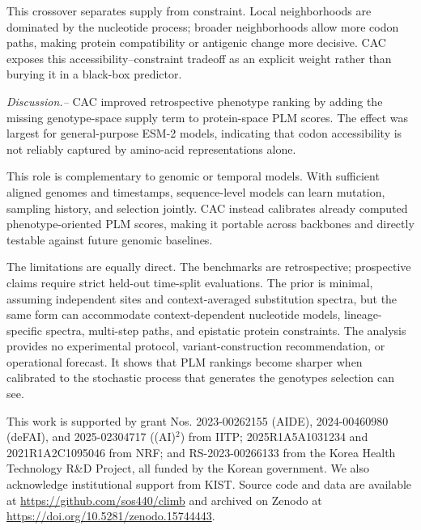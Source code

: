 \documentclass[aps,prl,reprint,superscriptaddress,nofootinbib,floatfix]{revtex4-2}
\begin{document}
This crossover separates supply from constraint. Local neighborhoods are dominated by the nucleotide process; broader neighborhoods allow more codon paths, making protein compatibility or antigenic change more decisive. CAC exposes this accessibility--constraint tradeoff as an explicit weight rather than burying it in a black-box predictor.

\emph{Discussion.--}
CAC improved retrospective phenotype ranking by adding the missing genotype-space supply term to protein-space PLM scores. The effect was largest for general-purpose ESM-2 models, indicating that codon accessibility is not reliably captured by amino-acid representations alone.

This role is complementary to genomic or temporal models. With sufficient aligned genomes and timestamps, sequence-level models can learn mutation, sampling history, and selection jointly. CAC instead calibrates already computed phenotype-oriented PLM scores, making it portable across backbones and directly testable against future genomic baselines.

The limitations are equally direct. The benchmarks are retrospective; prospective claims require strict held-out time-split evaluations. The prior is minimal, assuming independent sites and context-averaged substitution spectra, but the same form can accommodate context-dependent nucleotide models, lineage-specific spectra, multi-step paths, and epistatic protein constraints. The analysis provides no experimental protocol, variant-construction recommendation, or operational forecast. It shows that PLM rankings become sharper when calibrated to the stochastic process that generates the genotypes selection can see.

\begin{acknowledgments}
This work is supported by grant Nos. 2023-00262155 (AIDE), 2024-00460980 (deFAI), and 2025-02304717 ((AI)$^2$) from IITP; 2025R1A5A1031234 and 2021R1A2C1095046 from NRF; and RS-2023-00266133 from the Korea Health Technology R\&D Project, all funded by the Korean government. We also acknowledge institutional support from KIST. Source code and data are available at \url{https://github.com/sos440/climb} and archived on Zenodo at \url{https://doi.org/10.5281/zenodo.15744443}.
\end{acknowledgments}


\end{document}
